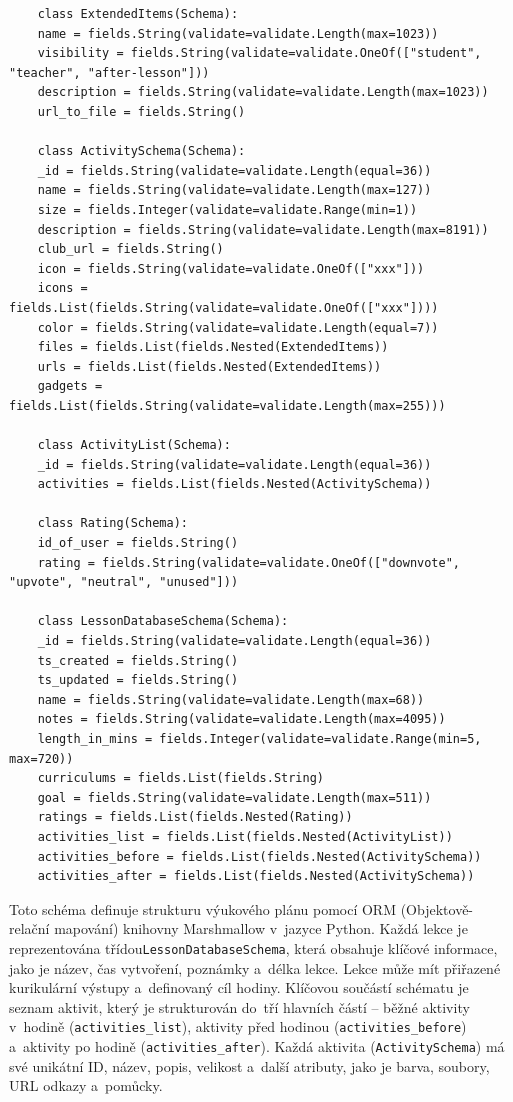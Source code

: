\documentclass[male,czech,api_bc]{kitheses}
\begin{document}
\newpage %

\begin{lstlisting}
	class ExtendedItems(Schema):
	name = fields.String(validate=validate.Length(max=1023))
	visibility = fields.String(validate=validate.OneOf(["student", "teacher", "after-lesson"]))
	description = fields.String(validate=validate.Length(max=1023))
	url_to_file = fields.String()
	
	class ActivitySchema(Schema):
	_id = fields.String(validate=validate.Length(equal=36))
	name = fields.String(validate=validate.Length(max=127))
	size = fields.Integer(validate=validate.Range(min=1))
	description = fields.String(validate=validate.Length(max=8191))
	club_url = fields.String()
	icon = fields.String(validate=validate.OneOf(["xxx"]))
	icons = fields.List(fields.String(validate=validate.OneOf(["xxx"])))
	color = fields.String(validate=validate.Length(equal=7))
	files = fields.List(fields.Nested(ExtendedItems))
	urls = fields.List(fields.Nested(ExtendedItems))
	gadgets = fields.List(fields.String(validate=validate.Length(max=255)))
	
	class ActivityList(Schema):
	_id = fields.String(validate=validate.Length(equal=36))
	activities = fields.List(fields.Nested(ActivitySchema))
	
	class Rating(Schema):
	id_of_user = fields.String()
	rating = fields.String(validate=validate.OneOf(["downvote", "upvote", "neutral", "unused"]))
	
	class LessonDatabaseSchema(Schema):
	_id = fields.String(validate=validate.Length(equal=36))
	ts_created = fields.String()
	ts_updated = fields.String()
	name = fields.String(validate=validate.Length(max=68))
	notes = fields.String(validate=validate.Length(max=4095))
	length_in_mins = fields.Integer(validate=validate.Range(min=5, max=720))
	curriculums = fields.List(fields.String)
	goal = fields.String(validate=validate.Length(max=511))
	ratings = fields.List(fields.Nested(Rating))
	activities_list = fields.List(fields.Nested(ActivityList))
	activities_before = fields.List(fields.Nested(ActivitySchema))
	activities_after = fields.List(fields.Nested(ActivitySchema))
\end{lstlisting}

Toto schéma definuje strukturu výukového plánu pomocí ORM (Objektově-relační mapování) knihovny Marshmallow v~jazyce Python. Každá lekce je reprezentována třídou\break\texttt{LessonDatabaseSchema}, která obsahuje klíčové informace, jako je název, čas vytvoření, poznámky a~délka lekce. Lekce může mít přiřazené kurikulární výstupy a~definovaný cíl hodiny. Klíčovou součástí schématu je seznam aktivit, který je strukturován do~tří hlavních částí – běžné aktivity v~hodině (\texttt{activities\_list}), aktivity před hodinou (\texttt{activities\_before}) a~aktivity po hodině (\texttt{activities\_after}). Každá aktivita (\texttt{ActivitySchema}) má své unikátní ID, název, popis, velikost a~další atributy, jako je barva, soubory, URL odkazy a~pomůcky.
\end{document}
